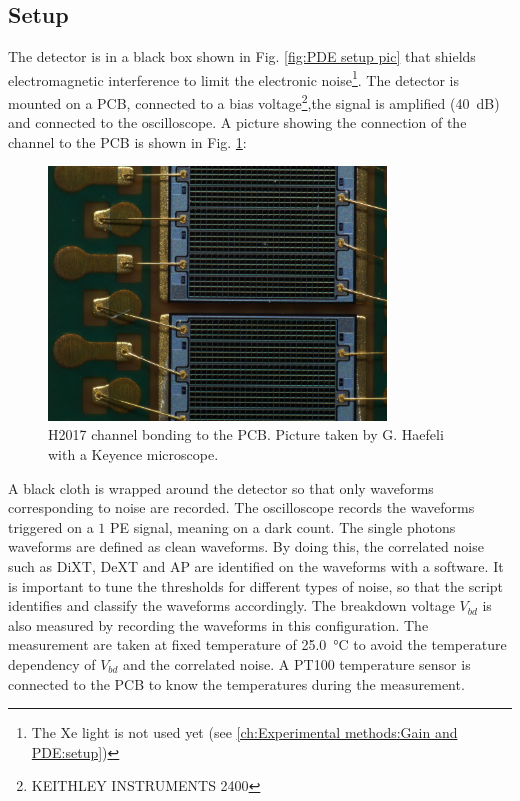 \subsection{Setup}
\label{ch:Experimental setup:WA:setup}
The detector is in a black box shown in Fig. \ref{fig:PDE setup pic} that shields electromagnetic interference to limit the electronic noise\footnote{The Xe light is not used yet (see \ref{ch:Experimental methods:Gain and PDE:setup})}. The detector is mounted on a PCB, connected to a bias voltage\footnote{KEITHLEY INSTRUMENTS 2400},the signal is amplified (\SI{40}{dB}) and connected to the oscilloscope. A picture showing the connection of the channel to the PCB is shown in Fig. \ref{fig:PCB channel picture}:
\begin{figure}[htbp]
    \centering
    \includegraphics[width=0.8\textwidth]{gfx/pictures/PCBchannel.jpg}
    \caption{H2017 channel bonding to the PCB. Picture taken by G. Haefeli with a Keyence microscope. }
    \label{fig:PCB channel picture}
\end{figure}
A black cloth is wrapped around the detector so that only waveforms corresponding to noise are recorded.
The oscilloscope records the waveforms triggered on a $1$ PE signal, meaning on a dark count. The single photons waveforms are defined as clean waveforms. By doing this, the correlated noise such as DiXT, DeXT and AP are identified on the waveforms with a software. It is important to tune the thresholds for different types of noise, so that the script identifies and classify the waveforms accordingly. The breakdown voltage $V_{bd}$ is also measured by recording the waveforms in this configuration. The measurement are taken at fixed temperature of \SI{25.0}{\celsius} to avoid the temperature dependency of $V_{bd}$ and the correlated noise. A PT100 temperature sensor is connected to the PCB to know the temperatures during the measurement. 

